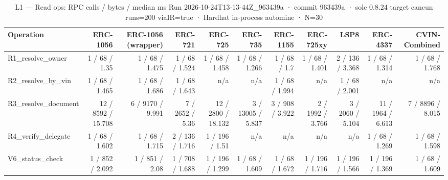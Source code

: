 \begin{table}[ht]
\centering
\small
\begin{tabular}{lrrrrrrrrrr}
\toprule
Operation & ERC-1056 & ERC-1056 (wrapper) & ERC-721 & ERC-725 & ERC-735 & ERC-1155 & ERC-725xy & LSP8 & ERC-4337 & CVIN-Combined \\
\midrule
R1\_resolve\_owner & 1 / 68 / 1.35 & 1 / 68 / 1.475 & 1 / 68 / 1.524 & 1 / 68 / 1.458 & 1 / 68 / 1.266 & 1 / 68 / 1.7 & 1 / 68 / 1.401 & 2 / 136 / 3.368 & 1 / 68 / 1.314 & 1 / 68 / 1.768 \\
R2\_resolve\_by\_vin & 1 / 68 / 1.465 & 1 / 68 / 1.686 & 1 / 68 / 1.643 & n/a & n/a & 1 / 68 / 1.994 & n/a & 1 / 68 / 2.001 & n/a & n/a \\
R3\_resolve\_document & 12 / 8592 / 15.708 & 6 / 9170 / 9.991 & 7 / 2652 / 5.36 & 12 / 2800 / 18.132 & 3 / 13005 / 5.837 & 3 / 908 / 3.922 & 2 / 1992 / 3.766 & 3 / 2060 / 5.104 & 11 / 1964 / 6.613 & 7 / 8896 / 8.015 \\
R4\_verify\_delegate & 1 / 68 / 1.602 & 1 / 68 / 1.715 & 2 / 136 / 1.716 & 1 / 196 / 1.51 & n/a & n/a & n/a & n/a & 1 / 68 / 1.269 & 1 / 68 / 1.598 \\
V6\_status\_check & 1 / 852 / 2.092 & 1 / 851 / 2.08 & 1 / 708 / 1.688 & 1 / 196 / 1.299 & 1 / 68 / 1.609 & 1 / 68 / 1.672 & 1 / 196 / 1.716 & 1 / 196 / 1.566 & 1 / 196 / 1.369 & 1 / 68 / 1.609 \\
\bottomrule
\end{tabular}
\caption{L1 — Read ops: RPC calls / bytes / median ms Run 2026-10-24T13-13-44Z\_963439a · commit 963439a · solc 0.8.24 target cancun runs=200 viaIR=true · Hardhat in-process automine · N=30}
\label{tab:crud_reads}
\end{table}
